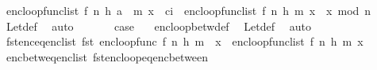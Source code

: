 \begin{isabellebody}
\ {\isachardoublequoteopen}enc{\isacharunderscore}{\kern0pt}loop{\isacharunderscore}{\kern0pt}func{\isacharunderscore}{\kern0pt}list\ {\isacharparenleft}{\kern0pt}f{\isacharcomma}{\kern0pt}\ n{\isacharcomma}{\kern0pt}\ h{\isacharcomma}{\kern0pt}\ a\ {\isacharhash}{\kern0pt}\ m{\isacharparenright}{\kern0pt}\ x\ {\isacharequal}{\kern0pt}\ {\isacharquery}{\kern0pt}c{\isacharunderscore}{\kern0pt}i\ {\isacharhash}{\kern0pt}\ enc{\isacharunderscore}{\kern0pt}loop{\isacharunderscore}{\kern0pt}func{\isacharunderscore}{\kern0pt}list\ {\isacharparenleft}{\kern0pt}f{\isacharcomma}{\kern0pt}\ n{\isacharcomma}{\kern0pt}\ h{\isacharcomma}{\kern0pt}\ m{\isacharparenright}{\kern0pt}\ {\isacharparenleft}{\kern0pt}x\ {\isacharasterisk}{\kern0pt}\ x\ mod\ n{\isacharparenright}{\kern0pt}{\isachardoublequoteclose}\isanewline
\ \ \ \ \isamarkupfalse%
\ Let{\isacharunderscore}{\kern0pt}def\ \isamarkupfalse%
\ auto\ \ \ \isanewline
\ \ \isamarkupfalse%
\ {\isacharquery}{\kern0pt}case\ \ \isamarkupfalse%
\ enc{\isacharunderscore}{\kern0pt}loop{\isacharunderscore}{\kern0pt}betw{\isacharunderscore}{\kern0pt}def\ \isamarkupfalse%
\ Let{\isacharunderscore}{\kern0pt}def\ \isamarkupfalse%
\ auto\isanewline
{}\isamarkupfalse%
%
\endisatagproof
{\isafoldproof}%
%
\isadelimproof
\isanewline
%
\endisadelimproof
\isanewline
{}\isamarkupfalse%
\ fst{\isacharunderscore}{\kern0pt}enc{\isacharunderscore}{\kern0pt}eq{\isacharunderscore}{\kern0pt}enc{\isacharunderscore}{\kern0pt}list{\isacharcolon}{\kern0pt}\ {\isachardoublequoteopen}fst\ {\isacharparenleft}{\kern0pt}enc{\isacharunderscore}{\kern0pt}loop{\isacharunderscore}{\kern0pt}func\ {\isacharparenleft}{\kern0pt}f{\isacharcomma}{\kern0pt}\ n{\isacharcomma}{\kern0pt}\ h{\isacharcomma}{\kern0pt}\ m{\isacharparenright}{\kern0pt}\ {\isacharbrackleft}{\kern0pt}{\isacharbrackright}{\kern0pt}\ x{\isacharparenright}{\kern0pt}\ {\isacharequal}{\kern0pt}\ enc{\isacharunderscore}{\kern0pt}loop{\isacharunderscore}{\kern0pt}func{\isacharunderscore}{\kern0pt}list\ {\isacharparenleft}{\kern0pt}f{\isacharcomma}{\kern0pt}\ n{\isacharcomma}{\kern0pt}\ h{\isacharcomma}{\kern0pt}\ m{\isacharparenright}{\kern0pt}\ x{\isachardoublequoteclose}\ \isanewline
%
\isadelimproof
\ \ %
\endisadelimproof
%
\isatagproof
{}\isamarkupfalse%
\ enc{\isacharunderscore}{\kern0pt}betw{\isacharunderscore}{\kern0pt}eq{\isacharunderscore}{\kern0pt}enc{\isacharunderscore}{\kern0pt}list\ fst{\isacharunderscore}{\kern0pt}enc{\isacharunderscore}{\kern0pt}loop{\isacharunderscore}{\kern0pt}eq{\isacharunderscore}{\kern0pt}enc{\isacharunderscore}{\kern0pt}between\ \isamarkupfalse%

\end{isabellebody}
